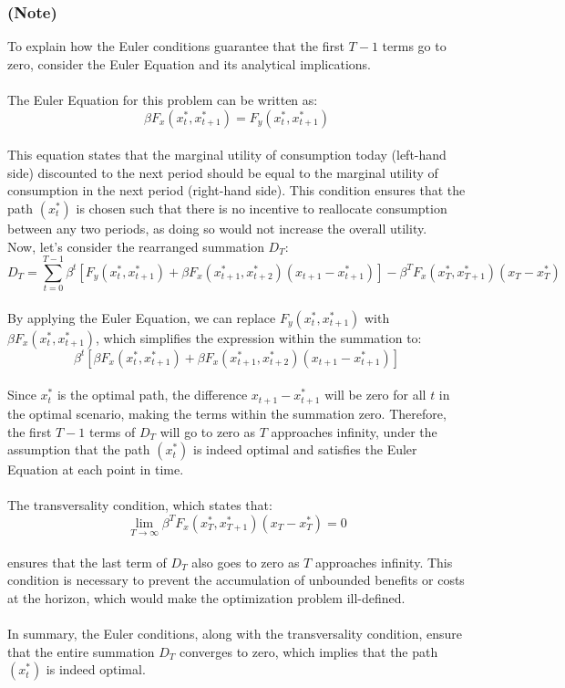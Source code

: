 \documentclass[12pt]{extarticle}
\def\secondarycolor{Golden}
\newcommand{\partof}[1]{
    \subsubsection*{\textcolor{\secondarycolor}{(#1)}}
    \addcontentsline{toc}{subsubsection}{\protect\numberline{}#1}
}
\begin{document}
\partof{Note}
To explain how the Euler conditions guarantee that the first $ T - 1 $ terms go to zero, consider the Euler Equation and its analytical implications.\\\\
The Euler Equation for this problem can be written as:
$$
\beta F_x(x^*_t, x^*_{t+1}) = F_y(x^*_t, x^*_{t+1})
$$\\
This equation states that the marginal utility of consumption today (left-hand side) discounted to the next period should be equal to the marginal utility of consumption in the next period (right-hand side). This condition ensures that the path $ (x^*_t) $ is chosen such that there is no incentive to reallocate consumption between any two periods, as doing so would not increase the overall utility.\\
Now, let's consider the rearranged summation $ D_T $:
$$
D_T = \sum_{t=0}^{T-1} \beta^t \left[ F_y(x^*_t, x^*_{t+1}) + \beta F_x(x^*_{t+1}, x^*_{t+2})(x_{t+1} - x^*_{t+1}) \right] - \beta^T F_x(x^*_T, x^*_{T+1})(x_T - x^*_T)
$$\\
By applying the Euler Equation, we can replace $ F_y(x^*_t, x^*_{t+1}) $ with $ \beta F_x(x^*_t, x^*_{t+1}) $, which simplifies the expression within the summation to:
$$
\beta^t \left[ \beta F_x(x^*_t, x^*_{t+1}) + \beta F_x(x^*_{t+1}, x^*_{t+2})(x_{t+1} - x^*_{t+1}) \right]
$$\\
Since $ x^*_t $ is the optimal path, the difference $ x_{t+1} - x^*_{t+1} $ will be zero for all $ t $ in the optimal scenario, making the terms within the summation zero. Therefore, the first $ T - 1 $ terms of $ D_T $ will go to zero as $ T $ approaches infinity, under the assumption that the path $ (x^*_t) $ is indeed optimal and satisfies the Euler Equation at each point in time.\\\\
\newpage
The transversality condition, which states that:
$$
\lim_{T \to \infty} \beta^T F_x(x^*_T, x^*_{T+1})(x_T - x^*_T) = 0
$$\\
ensures that the last term of $ D_T $ also goes to zero as $ T $ approaches infinity. This condition is necessary to prevent the accumulation of unbounded benefits or costs at the horizon, which would make the optimization problem ill-defined.\\\\
In summary, the Euler conditions, along with the transversality condition, ensure that the entire summation $ D_T $ converges to zero, which implies that the path $ (x^*_t) $ is indeed optimal.\\
\end{document}
